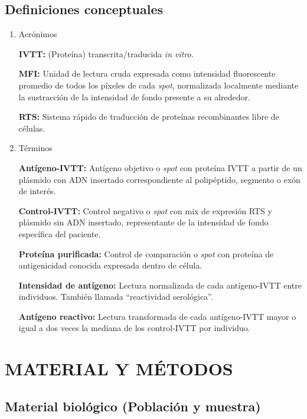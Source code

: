 \documentclass[a4paper]{article}
\begin{document}
\subsection{Definiciones conceptuales}\label{definiciones-conceptuales}

\begin{enumerate}
\def\labelenumi{\alph{enumi}.}
\item
  Acrónimos

  \textbf{IVTT:} (Proteína) transcrita/traducida \emph{in vitro}.

  \textbf{MFI:} Unidad de lectura cruda expresada como intensidad
  fluorescente promedio de todos los píxeles de cada \emph{spot},
  normalizada localmente mediante la sustracción de la intensidad de
  fondo presente a su alrededor.

  \textbf{RTS:} Sistema rápido de traducción de proteínas recombinantes
  libre de células.
\item
  Términos

  \textbf{Antígeno-IVTT:} Antígeno objetivo o \emph{spot} con proteína
  IVTT a partir de un plásmido con ADN insertado correspondiente al
  polipéptido, segmento o exón de interés.

  \textbf{Control-IVTT:} Control negativo o \emph{spot} con mix de
  expresión RTS y plásmido sin ADN insertado, representante de la
  intensidad de fondo específica del paciente.

  \textbf{Proteína purificada:} Control de comparación o \emph{spot} con
  proteína de antigenicidad conocida expresada dentro de célula.

  \textbf{Intensidad de antígeno:} Lectura normalizada de cada
  antígeno-IVTT entre individuos. También llamada ``reactividad
  serológica''.

  \textbf{Antígeno reactivo:} Lectura transformada de cada antígeno-IVTT
  mayor o igual a dos veces la mediana de los control-IVTT por
  individuo.
\end{enumerate}

\section{MATERIAL Y MÉTODOS}\label{meto}

\subsection{Material biológico (Población y
muestra)}\label{material-biologico-poblacion-y-muestra}
\end{document}
